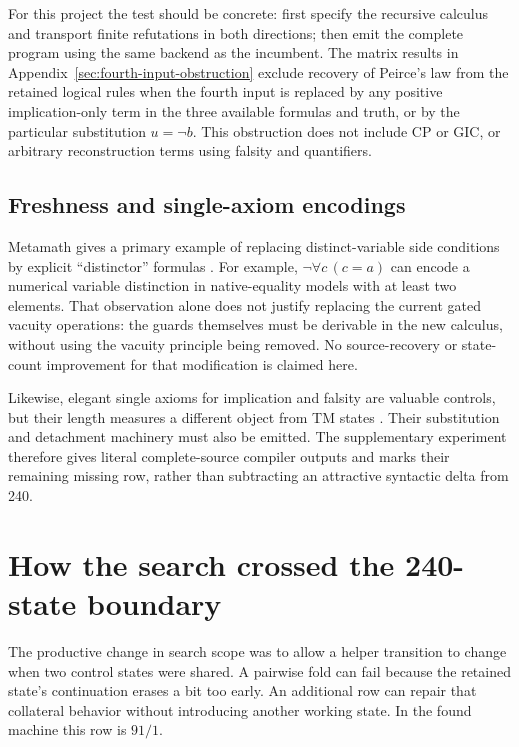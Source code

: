 \documentclass[11pt,a4paper]{article}
\begin{document}
For this project the test should be concrete: first specify the recursive
calculus and transport finite refutations in both directions; then emit
the complete program using the same backend as the incumbent. The
matrix results in Appendix~\ref{sec:fourth-input-obstruction} exclude
recovery of Peirce's law from the retained logical rules when the fourth
input is replaced by any positive implication-only term in the three
available formulas and truth, or by the particular substitution $u=\neg b$.
This obstruction does not include CP or GIC, or arbitrary reconstruction
terms using falsity and quantifiers.

\subsection{Freshness and single-axiom encodings}

Metamath gives a primary example of replacing distinct-variable side
conditions by explicit ``distinctor'' formulas \cite{distinctors}.
For example, $\neg\forall c\,(c=a)$ can encode a numerical variable
distinction in native-equality models with at least two elements.
That observation alone does not justify replacing the current gated
vacuity operations: the guards themselves must be derivable in the
new calculus, without using the vacuity principle being removed.
No source-recovery or state-count improvement for that modification
is claimed here.

Likewise, elegant single axioms for implication and falsity are valuable
controls, but their length measures a different object from TM states
\cite{singleaxioms}. Their substitution and detachment machinery must
also be emitted. The supplementary experiment therefore gives literal
complete-source compiler outputs and marks their remaining missing row,
rather than subtracting an attractive syntactic delta from 240.



\section{How the search crossed the 240-state boundary}

The productive change in search scope was to allow a helper transition
to change when two control states were shared. A pairwise fold can fail
because the retained state's continuation erases a bit too early. An
additional row can repair that collateral behavior without introducing
another working state. In the found machine this row is $91/1$.
\end{document}

